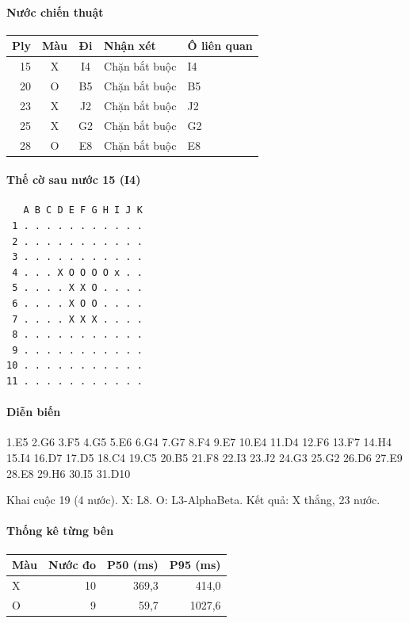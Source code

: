 \paragraph{Nước chiến thuật}
\begin{center}\small
\begin{tabular}{@{}rccll@{}}
\toprule
Ply & Màu & Đi & Nhận xét & Ô liên quan \\
\midrule
15 & X & I4 & Chặn bắt buộc & I4 \\
20 & O & B5 & Chặn bắt buộc & B5 \\
23 & X & J2 & Chặn bắt buộc & J2 \\
25 & X & G2 & Chặn bắt buộc & G2 \\
28 & O & E8 & Chặn bắt buộc & E8 \\
\bottomrule
\end{tabular}
\end{center}
\paragraph{Thế cờ sau nước 15 (I4)}
\begin{verbatim}
   A B C D E F G H I J K
 1 . . . . . . . . . . .
 2 . . . . . . . . . . .
 3 . . . . . . . . . . .
 4 . . . X O O O O x . .
 5 . . . . X X O . . . .
 6 . . . . X O O . . . .
 7 . . . . X X X . . . .
 8 . . . . . . . . . . .
 9 . . . . . . . . . . .
10 . . . . . . . . . . .
11 . . . . . . . . . . .
\end{verbatim}
\paragraph{Diễn biến}
{\footnotesize 1.E5 2.G6 3.F5 4.G5 5.E6 6.G4 7.G7 8.F4 9.E7 10.E4 11.D4 12.F6 13.F7 14.H4 15.I4 16.D7 17.D5 18.C4 19.C5 20.B5 21.F8 22.I3 23.J2 24.G3 25.G2 26.D6 27.E9 28.E8 29.H6 30.I5 31.D10\par}
Khai cuộc 19 (4 nước). X: L8. O: L3-AlphaBeta. Kết quả: X thắng, 23 nước.
\paragraph{Thống kê từng bên}
\begin{center}\small
\begin{tabular}{@{}lrrr@{}}
\toprule
Màu & Nước đo & P50 (ms) & P95 (ms) \\
\midrule
X & 10 & 369,3 & 414,0 \\
O & 9 & 59,7 & 1027,6 \\
\bottomrule
\end{tabular}
\end{center}
